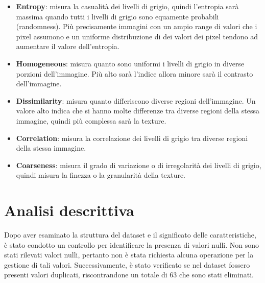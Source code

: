 \begin{enumerate}
\begin{itemize}
                  \item \textbf{Entropy}: misura la casualità dei livelli di
                        grigio, quindi l'entropia sarà massima quando tutti i
                        livelli di grigio sono equamente probabili (randomness).
                        Più precisamente immagini con un ampio range di valori
                        che i pixel assumono e un uniforme distribuzione di dei
                        valori dei pixel tendono ad aumentare il valore
                        dell'entropia.
                  \item \textbf{Homogeneous}: misura quanto sono uniformi i
                        livelli di grigio in diverse porzioni dell'immagine. Più alto sarà l'indice allora minore
                        sarà il contrasto dell'immagine.
                  \item \textbf{Dissimilarity}: misura quanto differiscono
                        diverse regioni dell'immagine. Un valore alto indica che
                        si hanno molte differenze tra diverse regioni della
                        stessa immagine, quindi più complessa sarà la texture.
                  \item \textbf{Correlation}: misura la correlazione dei livelli
                        di grigio tra diverse regioni della stessa immagine.
                  \item \textbf{Coarseness}: misura il grado di variazione o di
                        irregolarità dei livelli di grigio, quindi misura la
                        finezza o la granularità della texture.
            \end{itemize}
\end{enumerate}
\section{Analisi descrittiva}\label{sec:analisi-descrittiva}
Dopo aver esaminato la struttura del dataset e il significato delle
caratteristiche, è stato condotto un controllo per identificare la presenza di
valori nulli. Non sono stati rilevati valori nulli, pertanto non è stata
richiesta alcuna operazione per la gestione di tali valori. Successivamente, è
stato verificato se nel dataset fossero presenti valori duplicati, riscontrandone
un totale di $63$ che sono stati eliminati.


